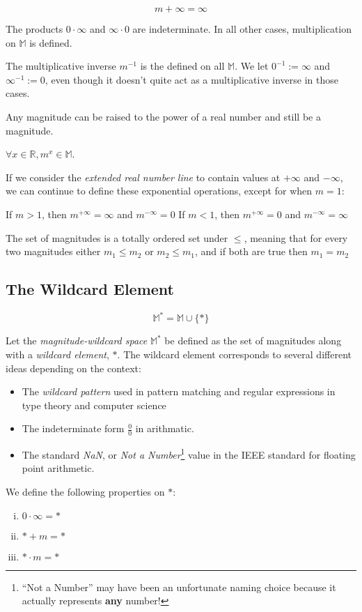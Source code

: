 \documentclass[twoside]{article}
\newcommand{\quotes}[1]{``#1''}
\begin{document}
\[m + \infty = \infty\]

The products \(0 \cdot \infty\) and \(\infty \cdot 0\) are indeterminate. In all other cases, multiplication on \(\mathbb{M}\) is defined.

The multiplicative inverse \(m^{-1}\) is the defined on all \(\mathbb{M}\). We let \(0^{-1} := \infty\) and \(\infty^{-1} := 0\), even though it doesn't quite act as a multiplicative inverse in those cases.

Any magnitude can be raised to the power of a real number and still be a magnitude.

\(\forall x \in \mathbb{R}, m^x \in \mathbb{M}\).

If we consider the \textit{extended real number line} to contain values at \(+\infty\) and \(-\infty\), we can continue to define these exponential operations, except for when \(m = 1\):

If \(m > 1\), then \(m^{+\infty} = \infty\) and \(m^{-\infty} = 0\)
If \(m < 1\), then \(m^{+\infty} = 0\) and \(m^{-\infty} = \infty\)

The set of magnitudes is a totally ordered set under \(\leq\), meaning that for every two magnitudes either \(m_1 \leq m_2\) or \(m_2 \leq m_1\), and if both are true then \(m_1 = m_2\)

\subsection{The Wildcard Element}

\[\mathbb{M}^* = \mathbb{M} \cup \{\ast\}\]

Let the \textit{magnitude-wildcard space} \(\mathbb{M}^*\) be defined as the set of magnitudes along with a \textit{wildcard element}, \(\ast\). The wildcard element corresponds to several different ideas depending on the context:
\begin{itemize}
  \item The \textit{wildcard pattern} used in pattern matching and regular expressions in type theory and computer science
  \item The indeterminate form \(\frac{0}{0}\) in arithmatic.
  \item The standard \textit{NaN}, or \textit{Not a Number}\footnote{\quotes{Not a Number} may have been an unfortunate naming choice because it actually represents \textbf{any} number!} value in the IEEE standard for floating point arithmetic.
\end{itemize}

We define the following properties on \(\ast\):
\begin{enumerate}[(i)]
  \item \(0 \cdot \infty = \ast\)
  \item \(\ast + m = \ast\)
  \item \(\ast \cdot m = \ast\)
\end{enumerate}
\end{document}
